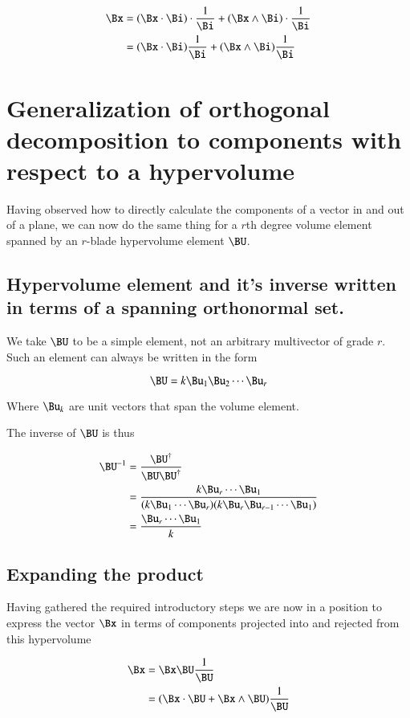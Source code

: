 \begin{align*}
\Bx 
&=
{(\Bx \cdot \Bi) \cdot \frac{1}{\Bi}} + {(\Bx \wedge \Bi) \cdot \frac{1}{\Bi}} \\
&=
{(\Bx \cdot \Bi) \frac{1}{\Bi}} + {(\Bx \wedge \Bi) \frac{1}{\Bi}} \\
\end{align*}

\section{Generalization of orthogonal decomposition to components with respect to a hypervolume }

Having observed how to directly calculate the components of a vector in and out of a plane, we can now do the
same thing for a $r$th degree volume element spanned by an $r$-blade hypervolume element $\BU$.

\subsection{Hypervolume element and it's inverse written in terms of a spanning orthonormal set. }
We take $\BU$ to be a simple element, not an arbitrary multivector of grade $r$.  Such an element can 
always be written in the form

\[
\BU = k \Bu_1 \Bu_2 \cdots \Bu_r
\]

Where $\Bu_k$ are unit vectors that span the volume element.

The inverse of $\BU$ is thus

\begin{align*}
\BU^{-1}
&= \frac{\BU^\dagger}{\BU \BU^\dagger} \\
&= \frac{k \Bu_r \cdots \Bu_1}{(k \Bu_1 \cdots \Bu_r)(k \Bu_r \Bu_{r-1} \cdots \Bu_1)} \\
&= \frac{\Bu_r \cdots \Bu_1}{k} \\
\end{align*}

\subsection{Expanding the product }

Having gathered the required introductory steps we are now in a position to express the vector $\Bx$ in terms
of components projected into and rejected from this hypervolume

\begin{align*}
\Bx &= \Bx \BU \frac{1}{\BU} \\
    &= (\Bx \cdot \BU + \Bx \wedge \BU)\frac{1}{\BU} \\
\end{align*}

